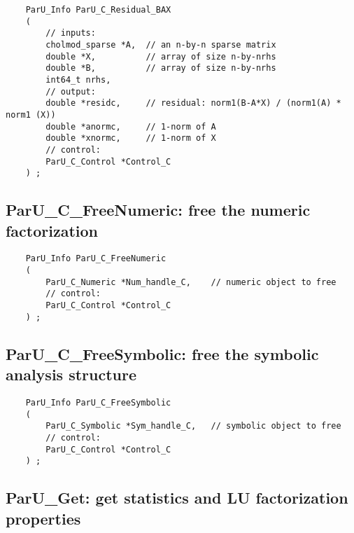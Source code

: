 \documentclass[12pt]{article}
\begin{document}
    {\footnotesize
    \begin{verbatim}
    ParU_Info ParU_C_Residual_BAX
    (
        // inputs:
        cholmod_sparse *A,  // an n-by-n sparse matrix
        double *X,          // array of size n-by-nrhs
        double *B,          // array of size n-by-nrhs
        int64_t nrhs,
        // output:
        double *residc,     // residual: norm1(B-A*X) / (norm1(A) * norm1 (X))
        double *anormc,     // 1-norm of A
        double *xnormc,     // 1-norm of X
        // control:
        ParU_C_Control *Control_C
    ) ; \end{verbatim} }

\subsection{{\sf ParU\_C\_FreeNumeric}: free the numeric factorization}

    {\footnotesize
    \begin{verbatim}
    ParU_Info ParU_C_FreeNumeric
    (
        ParU_C_Numeric *Num_handle_C,    // numeric object to free
        // control:
        ParU_C_Control *Control_C
    ) ; \end{verbatim} }

\subsection{{\sf ParU\_C\_FreeSymbolic}: free the symbolic analysis structure}

    {\footnotesize
    \begin{verbatim}
    ParU_Info ParU_C_FreeSymbolic
    (
        ParU_C_Symbolic *Sym_handle_C,   // symbolic object to free
        // control:
        ParU_C_Control *Control_C
    ) ; \end{verbatim} }

\subsection{{\sf ParU\_Get}: get statistics and LU factorization properties}
\end{document}
